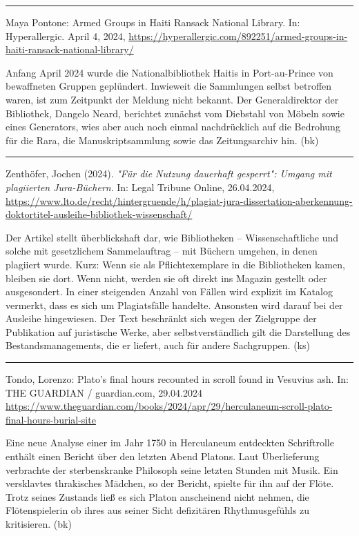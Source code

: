 \documentclass[a4paper,
fontsize=11pt,
oneside,
numbers=noperiodatend,
parskip=half-,
bibliography=totoc,
final
]{scrartcl}
\begin{document}
\begin{center}\rule{0.5\linewidth}{0.5pt}\end{center}

Maya Pontone: Armed Groups in Haiti Ransack National Library. In:
Hyperallergic. April 4, 2024,
\url{https://hyperallergic.com/892251/armed-groups-in-haiti-ransack-national-library/}

Anfang April 2024 wurde die Nationalbibliothek Haitis in Port-au-Prince
von bewaffneten Gruppen geplündert. Inwieweit die Sammlungen selbst
betroffen waren, ist zum Zeitpunkt der Meldung nicht bekannt. Der
Generaldirektor der Bibliothek, Dangelo Neard, berichtet zunächst vom
Diebstahl von Möbeln sowie eines Generators, wies aber auch noch einmal
nachdrücklich auf die Bedrohung für die Rara, die Manuskriptsammlung
sowie das Zeitungsarchiv hin. (bk)

\begin{center}\rule{0.5\linewidth}{0.5pt}\end{center}

Zenthöfer, Jochen (2024). \emph{"Für die Nut­zung dau­er­haft gesperrt":
Umgang mit plagiierten Jura-Büchern}. In: Legal Tribune Online,
26.04.2024,
\url{https://www.lto.de/recht/hintergruende/h/plagiat-jura-dissertation-aberkennung-doktortitel-ausleihe-bibliothek-wissenschaft/}

Der Artikel stellt überblickshaft dar, wie Bibliotheken --
Wissenschaftliche und solche mit gesetzlichem Sammelauftrag -- mit
Büchern umgehen, in denen plagiiert wurde. Kurz: Wenn sie als
Pflichtexemplare in die Bibliotheken kamen, bleiben sie dort. Wenn
nicht, werden sie oft direkt ins Magazin gestellt oder ausgesondert. In
einer steigenden Anzahl von Fällen wird explizit im Katalog vermerkt,
dass es sich um Plagiatsfälle handelte. Ansonsten wird darauf bei der
Ausleihe hingewiesen. Der Text beschränkt sich wegen der Zielgruppe der
Publikation auf juristische Werke, aber selbstverständlich gilt die
Darstellung des Bestandsmanagements, die er liefert, auch für andere
Sachgruppen. (ks)

\begin{center}\rule{0.5\linewidth}{0.5pt}\end{center}

Tondo, Lorenzo: Plato's final hours recounted in scroll found in
Vesuvius ash. In: THE GUARDIAN / guardian.com, 29.04.2024
\url{https://www.theguardian.com/books/2024/apr/29/herculaneum-scroll-plato-final-hours-burial-site}

Eine neue Analyse einer im Jahr 1750 in Herculaneum entdeckten
Schriftrolle enthält einen Bericht über den letzten Abend Platons. Laut
Überlieferung verbrachte der sterbenskranke Philosoph seine letzten
Stunden mit Musik. Ein versklavtes thrakisches Mädchen, so der Bericht,
spielte für ihn auf der Flöte. Trotz seines Zustands ließ es sich Platon
anscheinend nicht nehmen, die Flötenspielerin ob ihres aus seiner Sicht
defizitären Rhythmusgefühls zu kritisieren. (bk)
\end{document}
